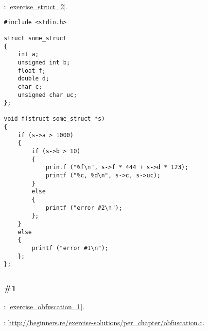 \Exercise: \ref{exercise_struct_2}.


\begin{lstlisting}
#include <stdio.h>

struct some_struct
{
	int a;
	unsigned int b;
	float f;
	double d;
	char c;
	unsigned char uc;
};

void f(struct some_struct *s)
{
	if (s->a > 1000)
	{
		if (s->b > 10)
		{
			printf ("%f\n", s->f * 444 + s->d * 123);
			printf ("%c, %d\n", s->c, s->uc);
		}
		else
		{
			printf ("error #2\n");
		};
	}
	else
	{
		printf ("error #1\n");
	};
};
\end{lstlisting}

\subsection{}

\subsubsection{\Exercise \#1}
\label{exercise_solutions_obfuscation_1}

\Exercise: \ref{exercise_obfuscation_1}.

: \url{http://beginners.re/exercise-solutions/per_chapter/obfuscation.c}.
